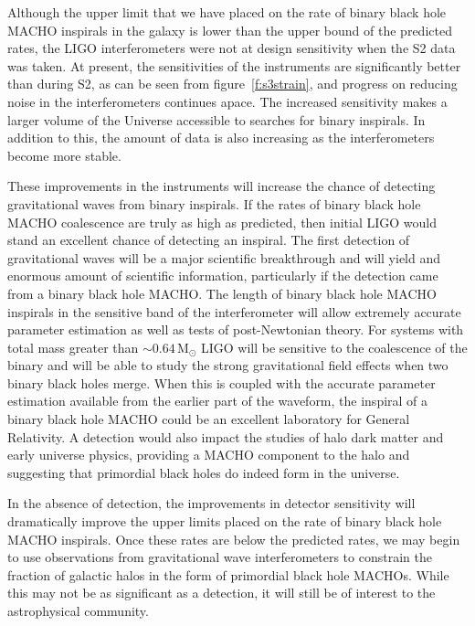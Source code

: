 
Although the upper limit that we have placed on the rate of binary black hole
MACHO inspirals in the galaxy is lower than the upper bound of the predicted
rates, the LIGO interferometers were not at design sensitivity when the S2
data was taken. At present, the sensitivities of the instruments are
significantly better than during S2, as can be seen from
figure~\ref{f:s3strain}, and progress on reducing noise in the interferometers
continues apace.  The increased sensitivity makes a larger volume of the
Universe accessible to searches for binary inspirals. In addition to this, the
amount of data is also increasing as the interferometers become more stable.

These improvements in the instruments will increase the chance of detecting
gravitational waves from binary inspirals. If the rates of binary black hole
MACHO coalescence are truly as high as predicted, then initial LIGO would
stand an excellent chance of detecting an inspiral. The first detection of
gravitational waves will be a major scientific breakthrough and will yield and
enormous amount of scientific information, particularly if the detection came
from a binary black hole MACHO. The length of binary black hole MACHO
inspirals in the sensitive band of the interferometer will allow extremely
accurate parameter estimation as well as tests of post-Newtonian theory. For
systems with total mass greater than $\sim 0.64\,\mathrm{M}_\odot$ LIGO will
be sensitive to the coalescence of the binary and will be able to study the
strong gravitational field effects when two binary black holes merge. When
this is coupled with the accurate parameter estimation available from the
earlier part of the waveform, the inspiral of a binary black hole MACHO could
be an excellent laboratory for General Relativity.  A detection would also
impact the studies of halo dark matter and early universe physics, providing a
MACHO component to the halo and suggesting that primordial black holes do
indeed form in the universe.

In the absence of detection, the improvements in detector sensitivity will
dramatically improve the upper limits placed on the rate of binary black hole
MACHO inspirals. Once these rates are below the predicted rates, we may begin
to use observations from gravitational wave interferometers to constrain the
fraction of galactic halos in the form of primordial black hole MACHOs. While
this may not be as significant as a detection, it will still be of interest to
the astrophysical community.

